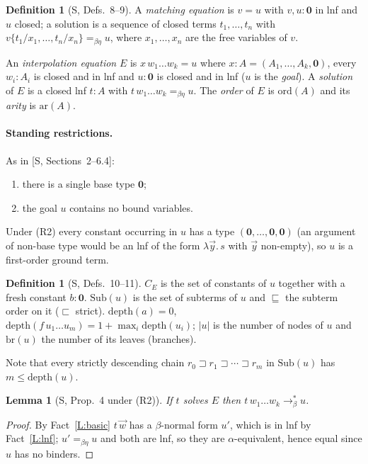 \documentclass[11pt]{article}
\newcommand{\Ground}{\mathbf{0}}
\newcommand{\ord}{\mathrm{ord}}
\newcommand{\ar}{\mathrm{ar}}
\newcommand{\Sub}{\mathrm{Sub}}
\newcommand{\depth}{\mathrm{depth}}
\newcommand{\br}{\mathrm{br}}
\newcommand{\CE}{C_E}
\newcommand{\sq}{\sqsubseteq}
\newcommand{\ssq}{\sqsubset}
\theoremstyle{plain}
\newtheorem{lemma}[theorem]{Lemma}
\theoremstyle{definition}
\newtheorem{definition}[theorem]{Definition}
\theoremstyle{remark}
\begin{document}
\begin{definition}[S, Defs.~8--9]
A \emph{matching equation} is $v=u$ with $v,u:\Ground$ in lnf and $u$
closed; a solution is a sequence of closed terms $t_1,\dots,t_n$ with
$v\{t_1/x_1,\dots,t_n/x_n\}=_{\beta\eta}u$, where $x_1,\dots,x_n$ are the
free variables of $v$.

An \emph{interpolation equation} $E$ is $x\,w_1\dots w_k=u$ where
$x:A=(A_1,\dots,A_k,\Ground)$, every $w_i:A_i$ is closed and in lnf and
$u:\Ground$ is closed and in lnf ($u$ is the \emph{goal}).  A
\emph{solution} of $E$ is a closed lnf $t:A$ with
$t\,w_1\dots w_k=_{\beta\eta}u$.  The \emph{order} of $E$ is $\ord(A)$
and its \emph{arity} is $\ar(A)$.
\end{definition}

\paragraph{Standing restrictions.} As in [S, Sections~2--6.4]:
\begin{enumerate}[(R1)]
\item there is a single base type $\Ground$;
\item the goal $u$ contains no bound variables.
\end{enumerate}
Under (R2) every constant occurring in $u$ has a type
$(\Ground,\dots,\Ground,\Ground)$ (an argument of non-base type would be
an lnf of the form $\lambda\vec y.\,s$ with $\vec y$ non-empty), so $u$
is a first-order ground term.

\begin{definition}[S, Defs.~10--11]
$\CE$ is the set of constants of $u$ together with a fresh constant
$b:\Ground$.  $\Sub(u)$ is the set of subterms of $u$ and $\sq$ the
subterm order on it ($\ssq$ strict).  $\depth(a)=0$,
$\depth(f\,u_1\dots u_m)=1+\max_i\depth(u_i)$; $|u|$ is the number of
nodes of $u$ and $\br(u)$ the number of its leaves (branches).
\end{definition}

Note that every strictly descending chain $r_0\sqsupset r_1\sqsupset\cdots
\sqsupset r_m$ in $\Sub(u)$ has $m\le\depth(u)$.

\begin{lemma}[S, Prop.~4 under (R2)]\label{lem:reduces}
If $t$ solves $E$ then $t\,w_1\dots w_k\to_\beta^*u$.
\end{lemma}
\begin{proof}
By Fact~\ref{L:basic} $t\,\vec w$ has a $\beta$-normal form $u'$, which is
in lnf by Fact~\ref{L:lnf}; $u'=_{\beta\eta}u$ and both are lnf, so they
are $\alpha$-equivalent, hence equal since $u$ has no binders.
\end{proof}
\end{document}
